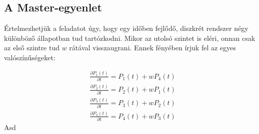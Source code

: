 \section{} \label{sec:2}


\subsection{A Master-egyenlet} \label{sub:2.1}

Értelmezhetjük a feladatot úgy, hogy egy időben fejlődő, diszkrét rendszer négy különböző állapotban tud tartózkodni. Mikor az utolsó szintet is eléri, onnan csak az első szintre tud $w$ rátával visszaugrani. Ennek fényében írjuk fel az egyes valószínűségeket:

\begin{align}
    &\frac{\partial P_{1} \left( t \right)}{\partial t}
    =
    P_{1} \left( t \right) + w P_{4} \left( t \right)
    \\
    &\frac{\partial P_{2} \left( t \right)}{\partial t}
    =
    P_{2} \left( t \right) + w P_{1} \left( t \right)
    \\
    &\frac{\partial P_{3} \left( t \right)}{\partial t}
    =
    P_{3} \left( t \right) + w P_{2} \left( t \right)
    \\
    &\frac{\partial P_{4} \left( t \right)}{\partial t}
    =
    P_{4} \left( t \right) + w P_{3} \left( t \right)
\end{align}
Asd